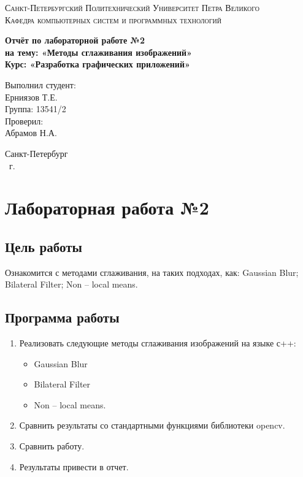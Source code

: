 \documentclass[14pt,a4paper,report]{report}
\begin{document}
\def\contentsname{Содержание}

\begin{titlepage}
	\begin{center}
		\textsc{Санкт-Петербургский Политехнический 
			Университет Петра Великого\\[5mm]
			Кафедра компьютерных систем и программных технологий}
		
		\vfill
		
		\textbf{Отчёт по лабораторной работе №2\\[3mm]
		на тему: «Методы сглаживания изображений»\\[3mm]
			Курс: «Разработка графических приложений»\\[41mm]
		}
	\end{center}
	
	\hfill
	\begin{minipage}{.4\textwidth}
		Выполнил студент:\\[2mm] 
		Ерниязов Т.Е.\\
		Группа: 13541/2\\[5mm]
		
		Проверил:\\[2mm] 
		Абрамов Н.А.
	\end{minipage}
	\vfill
	\begin{center}
		Санкт-Петербург\\ \the\year\ г.
	\end{center}
\end{titlepage}

\tableofcontents
\clearpage

\chapter{Лабораторная работа №2}

\section{Цель работы}

Ознакомится с методами сглаживания, на таких подходах, как: Gaussian Blur; Bilateral Filter; Non – local means.

\section{Программа работы}

\begin{enumerate}
\item Реализовать следующие методы сглаживания изображений на языке с++:
\begin{itemize}
\item Gaussian Blur
\item Bilateral Filter
\item Non – local means.
\end{itemize}
\item Сравнить результаты со стандартными функциями библиотеки opencv.
\item Сравнить работу.
\item Результаты привести в отчет.
\end{enumerate}
\end{document}
